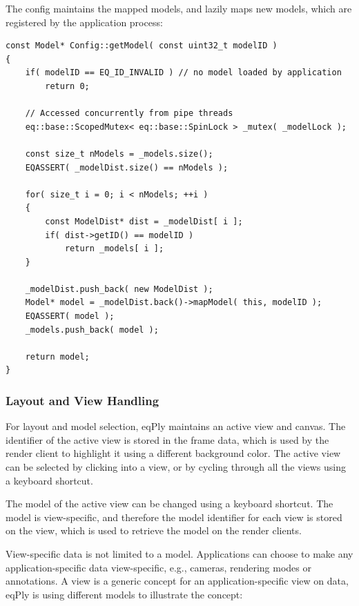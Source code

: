 \documentclass[10pt,a4]{scrartcl}
\begin{document}
The config maintains the mapped models, and lazily maps new models,
which are registered by the application process:

{\footnotesize\begin{lstlisting}
const Model* Config::getModel( const uint32_t modelID )
{
    if( modelID == EQ_ID_INVALID ) // no model loaded by application
        return 0;

    // Accessed concurrently from pipe threads
    eq::base::ScopedMutex< eq::base::SpinLock > _mutex( _modelLock );

    const size_t nModels = _models.size();
    EQASSERT( _modelDist.size() == nModels );

    for( size_t i = 0; i < nModels; ++i )
    {
        const ModelDist* dist = _modelDist[ i ];
        if( dist->getID() == modelID )
            return _models[ i ];
    }
    
    _modelDist.push_back( new ModelDist );
    Model* model = _modelDist.back()->mapModel( this, modelID );
    EQASSERT( model );
    _models.push_back( model );

    return model;
}
\end{lstlisting}}

\subsubsection{Layout and View Handling}

For layout and model selection, \textsf{eqPly} maintains an active view
and canvas. The identifier of the active view is stored in the frame
data, which is used by the render client to highlight it using a
different background color. The active view can be selected by clicking
into a view, or by cycling through all the views using a keyboard
shortcut.

The model of the active view can be changed using a keyboard
shortcut. The model is view-specific, and therefore the model identifier
for each view is stored on the view, which is used to retrieve the model
on the render clients. 

View-specific data is not limited to a model. Applications can choose to
make any application-specific data view-specific, e.g., cameras,
rendering modes or annotations. A view is a generic concept for an
application-specific view on data, \textsf{eqPly} is using different
models to illustrate the concept:
\end{document}

